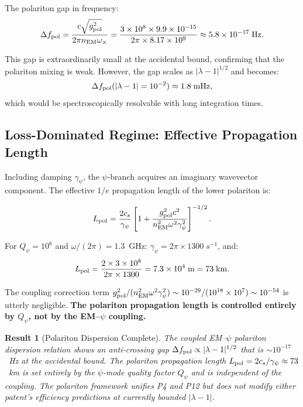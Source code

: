 \documentclass[aps,prd,twocolumn,superscriptaddress,nofootinbib]{revtex4-2}
\newcommand{\Qpsi}{Q_\psi}
\newtheorem{result}{Result}
\begin{document}
The polariton gap in frequency:
\begin{equation}
\Delta f_{\rm pol} = \frac{c\sqrt{g_{\rm pol}^2}}{2\pi n_{\rm EM}\omega_\times}
= \frac{3\times10^8\times9.9\times10^{-15}}{2\pi\times8.17\times10^9}
\approx 5.8\times10^{-17}\;\si{Hz}.
\end{equation}

This gap is extraordinarily small at the accidental bound, confirming
that the polariton mixing is weak. However, the gap scales as
$|\lambda-1|^{1/2}$ and becomes:
\begin{equation}
\Delta f_{\rm pol}(|\lambda-1| = 10^{-2}) \approx 1.8\;\si{mHz},
\end{equation}
which would be spectroscopically resolvable with long integration times.

\subsection{Loss-Dominated Regime: Effective Propagation Length}

Including damping $\gamma_\psi$, the $\psi$-branch acquires an
imaginary wavevector component. The effective $1/e$ propagation
length of the lower polariton is:

\begin{equation}
L_{\rm pol} = \frac{2c_s}{\gamma_\psi}
\left[1 + \frac{g_{\rm pol}^2 c^2}{n_{\rm EM}^2\omega^2\gamma_\psi^2}
\right]^{-1/2}.
\label{eq:polariton_length}
\end{equation}

For $\Qpsi = 10^6$ and $\omega/(2\pi) = 1.3$~GHz:
$\gamma_\psi = 2\pi\times1300\;\si{s^{-1}}$, and:
\begin{equation}
L_{\rm pol} = \frac{2\times3\times10^8}{2\pi\times1300}
= 7.3\times10^4\;\si{m} = 73\;\si{km}.
\end{equation}

The coupling correction term $g_{\rm pol}^2/(n_{\rm EM}^2\omega^2\gamma_\psi^2)
\sim 10^{-29}/(10^{18}\times10^7) \sim 10^{-54}$ is utterly negligible.
\textbf{The polariton propagation length is controlled entirely by
$\Qpsi$, not by the EM--$\psi$ coupling.}

\begin{result}[Polariton Dispersion Complete]
The coupled EM--$\psi$ polariton dispersion relation shows an
anti-crossing gap $\Delta f_{\rm pol} \propto |\lambda-1|^{1/2}$
that is $\sim 10^{-17}$~Hz at the accidental bound. The polariton
propagation length $L_{\rm pol} = 2c_s/\gamma_\psi \approx 73$~km
is set entirely by the $\psi$-mode quality factor $\Qpsi$ and is
independent of the coupling. The polariton framework unifies P4 and
P12 but does not modify either patent's efficiency predictions at
currently bounded $|\lambda-1|$.
\end{result}
\end{document}
